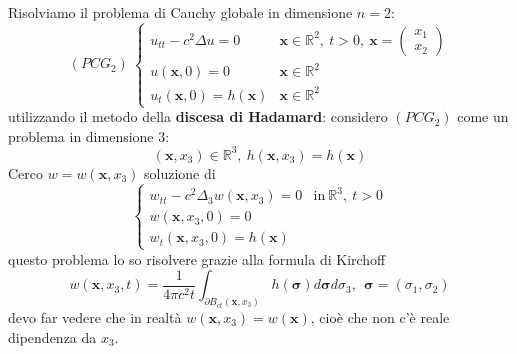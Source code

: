 \documentclass[10pt,a4paper,twoside,openright]{book}
\newcommand{\x}{\mathbf{x}}
\begin{document}
Risolviamo il problema di Cauchy globale in dimensione $\displaystyle n=2$:
\begin{equation*}
	( PCG_{2}) \ 
	\begin{cases}
		u_{tt} -c^{2} \Delta u=0            & \x \in \mathbb{R}^{2} ,\ t >0,\ \x = 
		\begin{pmatrix}
		x_{1}\\
		x_{2}
		\end{pmatrix}\\
		u(\x ,0) =0                 & \x\mathbb{\in R}^{2}                         \\
		u_{t}(\x ,0) =h(\x) & \x\mathbb{\in R}^{2}                         
	\end{cases}
\end{equation*}
utilizzando il metodo della \textbf{discesa di Hadamard}: considero $\displaystyle ( PCG_{2})$ come un problema in dimensione $\displaystyle 3$:
\begin{equation}
	(\x ,x_{3}) \in \mathbb{R}^{3} ,\ h(\x ,x_{3}) =h(\x)
\end{equation}
Cerco $\displaystyle w=w(\x ,x_{3})$ soluzione di
\begin{equation*}
	\begin{cases}
		w_{tt} -c^{2} \Delta _{3} w(\x ,x_{3}) =0 & \text{in} \ \mathbb{R}^{3} ,\ t >0 \\
		w(\x ,x_{3} ,0) =0                        &                                    \\
		w_{t}(\x ,x_{3} ,0) =h(\x)        &                                    
	\end{cases}
\end{equation*}
questo problema lo so risolvere grazie alla formula di Kirchoff
\begin{equation*}
	w(\x ,x_{3} ,t) =\frac{1}{4\pi c^{2} t}\int _{\partial B_{ct}(\x ,x_{3})} h(\bm{\sigma }) d\bm{\sigma } d\sigma _{3} ,\ \ \bm{\sigma } =( \sigma _{1} ,\sigma _{2})
\end{equation*}
devo far vedere che in realtà $\displaystyle w(\x ,x_{3}) =w(\x)$, cioè che non c'è reale dipendenza da $\displaystyle x_{3}$.
\end{document}
